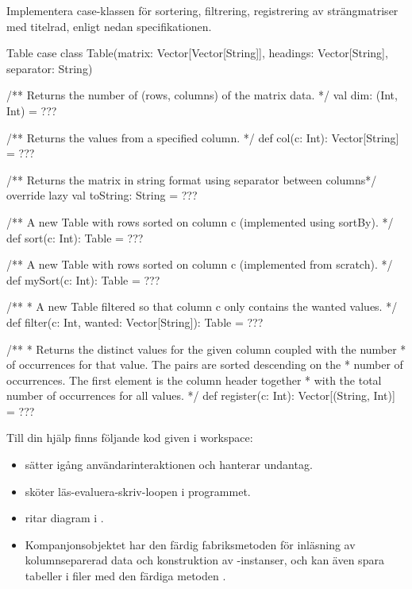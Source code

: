 \Task Implementera case-klassen  för sortering, filtrering, registrering av strängmatriser med titelrad, enligt nedan specifikationen.

\begin{ScalaSpec}{Table}
case class Table(matrix: Vector[Vector[String]],
                 headings: Vector[String],
                 separator: String) {

  /** Returns the number of (rows, columns) of the matrix data. */
  val dim: (Int, Int) = ???

  /** Returns the values from a specified column. */
  def col(c: Int): Vector[String] = ???

  /** Returns the matrix in string format using separator between columns*/
  override lazy val toString: String = ???

  /** A new Table with rows sorted on column c (implemented using sortBy). */
  def sort(c: Int): Table = ???

  /** A new Table with rows sorted on column c (implemented from scratch). */
  def mySort(c: Int): Table = ???

  /**
   * A new Table filtered so that column c only contains the wanted values.
   */
  def filter(c: Int, wanted: Vector[String]): Table = ???

  /**
   * Returns the distinct values for the given column coupled with the number
   * of occurrences for that value. The pairs are sorted descending on the
   * number of occurrences. The first element is the column header together
   * with the total number of occurrences for all values.
   */
  def register(c: Int): Vector[(String, Int)] = ???
}
\end{ScalaSpec}


Till din hjälp finns följande kod given i workspace:
\begin{itemize}
\item {} sätter igång användarinteraktionen och hanterar undantag.

\item {} sköter läs-evaluera-skriv-loopen i programmet.

\item {} ritar diagram i .

\item Kompanjonsobjektet  har den färdig fabriksmetoden  för inläsning av kolumnseparerad data och konstruktion av -instanser, och kan även spara tabeller i filer med den färdiga metoden .
\end{itemize}

